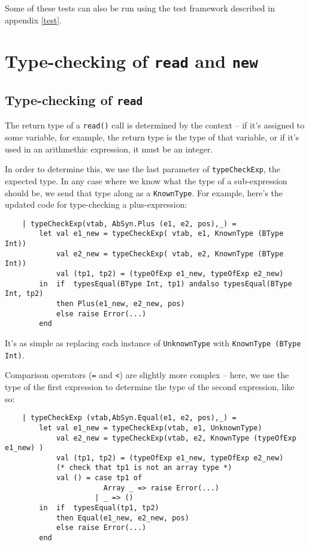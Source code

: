 \documentclass{article}
\begin{document}
Some of these tests can also be run using the test framework described in appendix \ref{test}.
\section{Type-checking of \texttt{read} and \texttt{new}}

\subsection{Type-checking of \texttt{read}}
The return type of a \texttt{read()} call is determined by the context -- if it's assigned to some variable, for example, the return type is the type of that variable, or if it's used in an arithmethic expression, it must be an integer.

In order to determine this, we use the last parameter of \texttt{typeCheckExp}, the expected type. In any case where we know what the type of a sub-expression should be, we send that type along as a \texttt{KnownType}. For example, here's the updated code for type-checking a plus-expression:

\begin{lstlisting}
    | typeCheckExp(vtab, AbSyn.Plus (e1, e2, pos),_) =
        let val e1_new = typeCheckExp( vtab, e1, KnownType (BType Int))
            val e2_new = typeCheckExp( vtab, e2, KnownType (BType Int))
            val (tp1, tp2) = (typeOfExp e1_new, typeOfExp e2_new)
        in  if  typesEqual(BType Int, tp1) andalso typesEqual(BType Int, tp2)
            then Plus(e1_new, e2_new, pos)
            else raise Error(...)
        end
\end{lstlisting}

It's as simple as replacing each instance of \texttt{UnknownType} with \texttt{KnownType (BType Int)}.

Comparison operators (\texttt{=} and \texttt{<}) are slightly more complex -- here, we use the type of the first expression to determine the type of the second expression, like so:

\begin{lstlisting}
    | typeCheckExp (vtab,AbSyn.Equal(e1, e2, pos),_) =
        let val e1_new = typeCheckExp(vtab, e1, UnknownType)
            val e2_new = typeCheckExp(vtab, e2, KnownType (typeOfExp e1_new) )
            val (tp1, tp2) = (typeOfExp e1_new, typeOfExp e2_new)
            (* check that tp1 is not an array type *)
            val () = case tp1 of
                       Array _ => raise Error(...)
                     | _ => ()
        in  if  typesEqual(tp1, tp2)
            then Equal(e1_new, e2_new, pos)
            else raise Error(...)
        end
\end{lstlisting}
\end{document}
